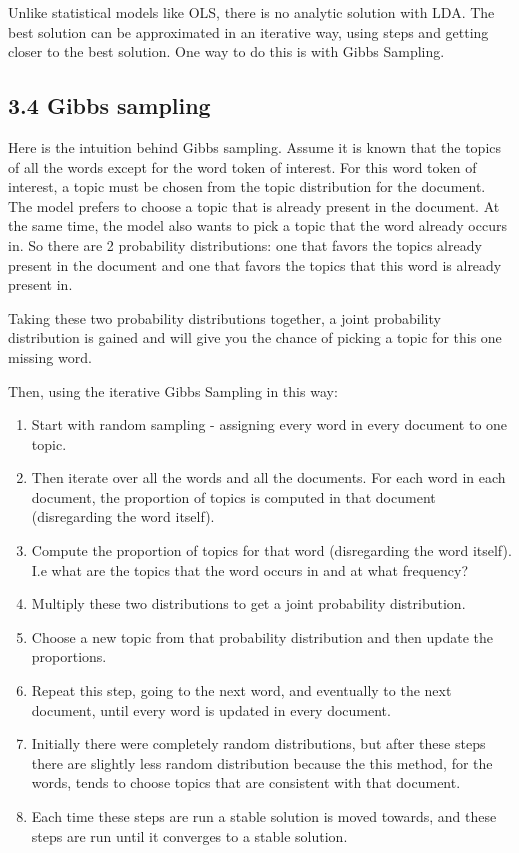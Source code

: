 \documentclass[
]{article}
\providecommand{\tightlist}{%
  \setlength{\itemsep}{0pt}\setlength{\parskip}{0pt}}
\begin{document}
Unlike statistical models like OLS, there is no analytic solution with
LDA. The best solution can be approximated in an iterative way, using
steps and getting closer to the best solution. One way to do this is
with Gibbs Sampling.

\hypertarget{gibbs-sampling}{%
\subsection{3.4 Gibbs sampling}\label{gibbs-sampling}}

Here is the intuition behind Gibbs sampling. Assume it is known that the
topics of all the words except for the word token of interest. For this
word token of interest, a topic must be chosen from the topic
distribution for the document. The model prefers to choose a topic that
is already present in the document. At the same time, the model also
wants to pick a topic that the word already occurs in. So there are 2
probability distributions: one that favors the topics already present in
the document and one that favors the topics that this word is already
present in.

Taking these two probability distributions together, a joint probability
distribution is gained and will give you the chance of picking a topic
for this one missing word.

Then, using the iterative Gibbs Sampling in this way:

\begin{enumerate}
\def\labelenumi{\arabic{enumi}.}
\tightlist
\item
  Start with random sampling - assigning every word in every document to
  one topic.
\item
  Then iterate over all the words and all the documents. For each word
  in each document, the proportion of topics is computed in that
  document (disregarding the word itself).
\item
  Compute the proportion of topics for that word (disregarding the word
  itself). I.e what are the topics that the word occurs in and at what
  frequency?
\item
  Multiply these two distributions to get a joint probability
  distribution.
\item
  Choose a new topic from that probability distribution and then update
  the proportions.
\item
  Repeat this step, going to the next word, and eventually to the next
  document, until every word is updated in every document.
\item
  Initially there were completely random distributions, but after these
  steps there are slightly less random distribution because the this
  method, for the words, tends to choose topics that are consistent with
  that document.
\item
  Each time these steps are run a stable solution is moved towards, and
  these steps are run until it converges to a stable solution.
\end{enumerate}
\end{document}
